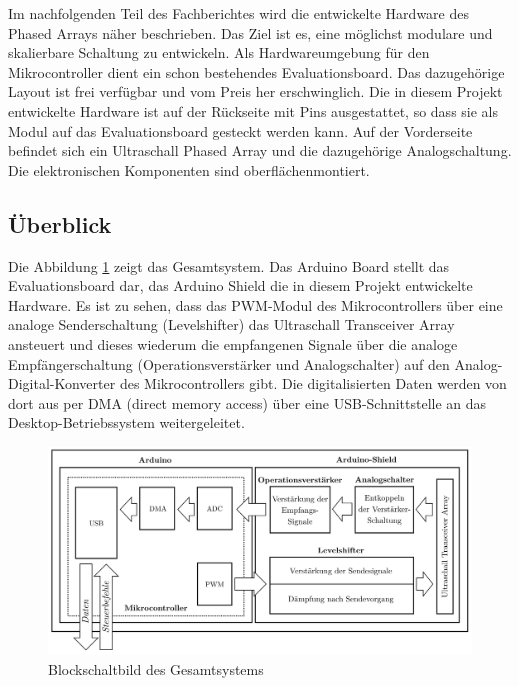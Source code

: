 Im nachfolgenden Teil des Fachberichtes wird die entwickelte Hardware des Phased Arrays näher beschrieben. Das Ziel ist es, eine möglichst modulare und skalierbare Schaltung zu entwickeln. Als Hardwareumgebung für den Mikrocontroller dient ein schon bestehendes Evaluationsboard. Das dazugehörige Layout ist frei verfügbar und vom Preis her erschwinglich. Die in diesem Projekt entwickelte Hardware ist auf der Rückseite mit Pins ausgestattet, so dass sie als Modul auf das Evaluationsboard gesteckt werden kann. Auf der Vorderseite befindet sich ein Ultraschall Phased Array und die dazugehörige Analogschaltung. Die elektronischen Komponenten sind oberflächenmontiert.


\subsection{Überblick}\label{sec:ueberblick}
Die Abbildung \ref{fig:image_hardware_schema} zeigt das Gesamtsystem. Das Arduino Board stellt das Evaluationsboard dar, das Arduino Shield die in diesem Projekt entwickelte Hardware. Es ist zu sehen, dass das PWM-Modul des Mikrocontrollers über eine analoge Senderschaltung (Levelshifter) das Ultraschall Transceiver Array ansteuert und dieses wiederum die empfangenen Signale über die analoge Empfängerschaltung (Operationsverstärker und Analogschalter) auf den Analog-Digital-Konverter des Mikrocontrollers gibt. Die digitalisierten Daten werden von dort aus per DMA (direct memory access) über eine USB-Schnittstelle an das Desktop-Betriebssystem weitergeleitet.

\begin{figure}[htb]
\includegraphics[width=\textwidth]{graphics/image_hardware_schema.png}
\caption{Blockschaltbild des Gesamtsystems} %
\label{fig:image_hardware_schema}
\end{figure}
%

